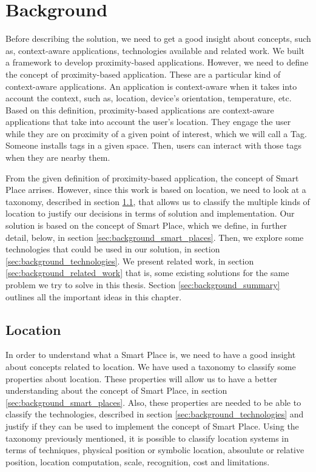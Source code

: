 
\section{Background}
\label{sec:background}
Before describing the solution, we need to get a good insight about concepts, such as, context-aware applications, technologies available and related work.
We built a framework to develop proximity-based applications.
However, we need to define the concept of proximity-based application.
These are a particular kind of context-aware applications.
An application is context-aware when it takes into account the context, such as, location, device's orientation, temperature, etc.
Based on this definition, proximity-based applications are context-aware applications that take into account the user's location.
They engage the user while they are on proximity of a given point of interest, which we will call a Tag.
Someone installs tags in a given space.
Then, users can interact with those tags when they are nearby them.

From the given definition of proximity-based application, the concept of Smart Place arrises.
However, since this work is based on location, we need to look at a taxonomy, described in section \ref{sec:background_location}, that allows us to classify the multiple kinds of location to justify our decisions in terms of solution and implementation.
Our solution is based on the concept of Smart Place, which we define, in further detail, below, in section \ref{sec:background_smart_places}.
Then, we explore some technologies that could be used in our solution, in section \ref{sec:background_technologies}.
We present related work,
in section \ref{sec:background_related_work} that is, some existing solutions for the same problem we try to solve in this thesis.
Section \ref{sec:background_summary} outlines all the important ideas in this chapter.

\subsection{Location}
\label{sec:background_location}
In order to understand what a Smart Place is, we need to have a good insight about concepts related to location.
We have used a taxonomy\cite{location} to classify some properties about location.
These properties will allow us to have a better understanding about the concept of Smart Place, in section \ref{sec:background_smart_places}.
Also, these properties are needed to be able to classify the technologies, described in section \ref{sec:background_technologies} and justify if they can be used to implement the concept of Smart Place.
Using the taxonomy previously mentioned, it is possible to classify location systems in terms of techniques, physical position or symbolic location, absoulute or relative position, location computation, scale, recognition, cost and limitations.

